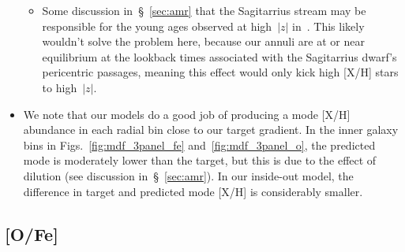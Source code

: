 \documentclass[a4paper, fleqn, usenatbib, useAMS]{mnras}
\begin{document}
\begin{itemize}
\begin{itemize}
		\item Some discussion in~\S~\ref{sec:amr} that the Sagitarrius stream 
		may be responsible for the young ages observed at high~$\left|z\right|$ 
		in~\citet{Feuillet2019}. This likely wouldn't solve the problem here, 
		because our annuli are at or near equilibrium at the lookback times 
		associated with the Sagitarrius dwarf's pericentric passages, meaning 
		this effect would only kick high [X/H] stars to high~$\left|z\right|$. 
	\end{itemize} 

	\item We note that our models do a good job of producing a mode [X/H] 
	abundance in each radial bin close to our target gradient. In the inner 
	galaxy bins in Figs.~\ref{fig:mdf_3panel_fe} and~\ref{fig:mdf_3panel_o}, 
	the predicted mode is moderately lower than the target, but this is due 
	to the effect of dilution (see discussion in~\S~\ref{sec:amr}). In our 
	inside-out model, the difference in target and predicted mode [X/H] is 
	considerably smaller. 
\end{itemize} 

\subsection{[O/Fe]} 
\label{sec:mdfs:ofe} 
\end{document}
